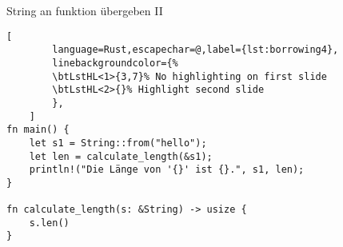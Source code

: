 \begin{frame}[fragile,t]{String an funktion übergeben II}
    \begin{lstlisting}[
        language=Rust,escapechar=@,label={lst:borrowing4},
        linebackgroundcolor={%
        \btLstHL<1>{3,7}% No highlighting on first slide
        \btLstHL<2>{}% Highlight second slide
        },
    ]
fn main() {
    let s1 = String::from("hello");
    let len = calculate_length(&s1);
    println!("Die Länge von '{}' ist {}.", s1, len);
}

fn calculate_length(s: &String) -> usize {
    s.len()
}\end{lstlisting}
    \pause
\end{frame}
